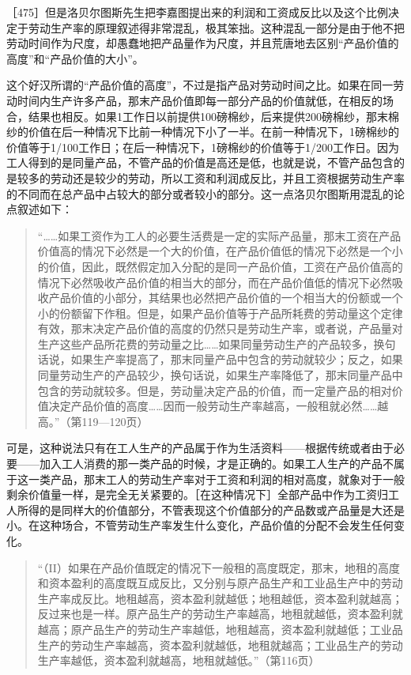 ［475］但是洛贝尔图斯先生把李嘉图提出来的利润和工资成反比以及这个比例决定于劳动生产率的原理叙述得非常混乱，极其笨拙。这种混乱一部分是由于他不把劳动时间作为尺度，却愚蠢地把产品量作为尺度，并且荒唐地去区别“产品价值的高度”和“产品价值的大小”。

这个好汉所谓的“产品价值的高度”，不过是指产品对劳动时间之比。如果在同一劳动时间内生产许多产品，那末产品价值即每一部分产品的价值就低，在相反的场合，结果也相反。如果1工作日以前提供100磅棉纱，后来提供200磅棉纱，那末棉纱的价值在后一种情况下比前一种情况下小了一半。在前一种情况下，1磅棉纱的价值等于1/100工作日；在后一种情况下，1磅棉纱的价值等于1/200工作日。因为工人得到的是同量产品，不管产品的价值是高还是低，也就是说，不管产品包含的是较多的劳动还是较少的劳动，所以工资和利润成反比，并且工资根据劳动生产率的不同而在总产品中占较大的部分或者较小的部分。这一点洛贝尔图斯用混乱的论点叙述如下：

\begin{quote}{“……如果工资作为工人的必要生活费是一定的实际产品量，那末工资在产品价值高的情况下必然是一个大的价值，在产品价值低的情况下必然是一个小的价值，因此，既然假定加入分配的是同一产品价值，工资在产品价值高的情况下必然吸收产品价值的相当大的部分，而在产品价值低的情况下必然吸收产品价值的小部分，其结果也必然把产品价值的一个相当大的份额或一个小的份额留下作租。但是，如果产品价值等于产品所耗费的劳动量这个定律有效，那末决定产品价值的高度的仍然只是劳动生产率，或者说，产品量对生产这些产品所花费的劳动量之比……如果同量劳动生产的产品较多，换句话说，如果生产率提高了，那末同量产品中包含的劳动就较少；反之，如果同量劳动生产的产品较少，换句话说，如果生产率降低了，那末同量产品中包含的劳动就较多。但是，劳动量决定产品的价值，而一定量产品的相对价值决定产品价值的高度……因而一般劳动生产率越高，一般租就必然……越高。”（第119—120页）}\end{quote}

可是，这种说法只有在工人生产的产品属于作为生活资料——根据传统或者由于必要——加入工人消费的那一类产品的时候，才是正确的。如果工人生产的产品不属于这一类产品，那末工人的劳动生产率对于工资和利润的相对高度，就象对于一般剩余价值量一样，是完全无关紧要的。［在这种情况下］全部产品中作为工资归工人所得的是同样大的价值部分，不管表现这个价值部分的产品数或产品量是大还是小。在这种场合，不管劳动生产率发生什么变化，产品价值的分配不会发生任何变化。


\begin{quote}{“（II）如果在产品价值既定的情况下一般租的高度既定，那末，地租的高度和资本盈利的高度既互成反比，又分别与原产品生产和工业品生产中的劳动生产率成反比。地租越高，资本盈利就越低；地租越低，资本盈利就越高；反过来也是一样。原产品生产的劳动生产率越高，地租就越低，资本盈利就越高；原产品生产的劳动生产率越低，地租越高，资本盈利就越低；工业品生产的劳动生产率越高，资本盈利就越低，地租就越高；工业品生产的劳动生产率越低，资本盈利就越高，地租就越低。”（第116页）}\end{quote}

